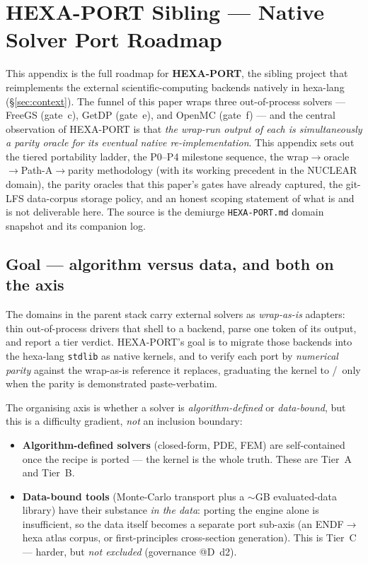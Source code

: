 \section{HEXA-PORT Sibling --- Native Solver Port Roadmap}
\label{app:hexaport}

This appendix is the full roadmap for \textbf{HEXA-PORT}, the sibling
project that reimplements the external scientific-computing backends
natively in hexa-lang (\S\ref{sec:context}). The funnel of this paper
wraps three out-of-process solvers --- FreeGS (gate~c), GetDP (gate~e),
and OpenMC (gate~f) --- and the central observation of HEXA-PORT is
that \emph{the wrap-run output of each is simultaneously a parity
oracle for its eventual native re-implementation}. This appendix sets
out the tiered portability ladder, the P0--P4 milestone sequence, the
wrap$\rightarrow$oracle$\rightarrow$Path-A$\rightarrow$parity
methodology (with its working precedent in the NUCLEAR domain), the
parity oracles that this paper's gates have already captured, the
git-LFS data-corpus storage policy, and an honest scoping statement of
what is and is not deliverable here. The source is the demiurge
\texttt{HEXA-PORT.md} domain snapshot and its companion log.

\subsection{Goal --- algorithm versus data, and both on the axis}
\label{app:hexaport:goal}

The domains in the parent stack carry external solvers as
\emph{wrap-as-is} adapters: thin out-of-process drivers that shell to a
backend, parse one token of its output, and report a tier verdict.
HEXA-PORT's goal is to migrate those backends into the hexa-lang
\texttt{stdlib} as native kernels, and to verify each port by
\emph{numerical parity} against the wrap-as-is reference it replaces,
graduating the kernel to \tierGreen/\tierBlue\ only when the parity is
demonstrated paste-verbatim.

The organising axis is whether a solver is \emph{algorithm-defined} or
\emph{data-bound}, but this is a difficulty gradient, \emph{not} an
inclusion boundary:
\begin{itemize}\itemsep0.2em
\item \textbf{Algorithm-defined solvers} (closed-form, PDE, FEM) are
self-contained once the recipe is ported --- the kernel is the whole
truth. These are Tier~A and Tier~B.
\item \textbf{Data-bound tools} (Monte-Carlo transport plus a
$\sim$GB evaluated-data library) have their substance \emph{in the
data}: porting the engine alone is insufficient, so the data itself
becomes a separate port sub-axis (an ENDF$\rightarrow$hexa atlas
corpus, or first-principles cross-section generation). This is
Tier~C --- harder, but \emph{not excluded} (governance @D~d2).
\end{itemize}

